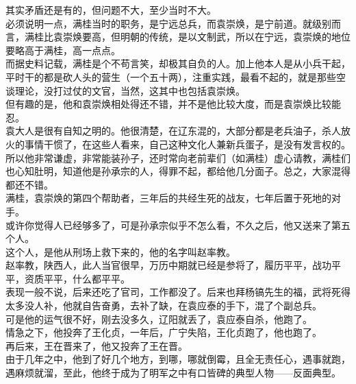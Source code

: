 \begin{multicols}{\theparacolNo}
其实矛盾还是有的，但问题不大，至少当时不大。\\

必须说明一点，满桂当时的职务，是宁远总兵，而袁崇焕，是宁前道。就级别而言，满桂比袁崇焕要高，但明朝的传统，是以文制武，所以在宁远，袁崇焕的地位要略高于满桂，高一点点。\\

而据史料记载，满桂是个不苟言笑，却极其自负的人。加上他本人是从小兵干起，平时干的都是砍人头的营生（一个五十两），注重实践，最看不起的，就是那些空谈理论，没打过仗的文官，当然，这其中也包括袁崇焕。\\

但有趣的是，他和袁崇焕相处得还不错，并不是他比较大度，而是袁崇焕比较能忍。\\

袁大人是很有自知之明的。他很清楚，在辽东混的，大部分都是老兵油子，杀人放火的事情干惯了，在这些人看来，自己这种文化人兼新兵蛋子，是没有发言权的。\\

所以他非常谦虚，非常能装孙子，还时常向老前辈们（如满桂）虚心请教，满桂们也心知肚明，知道他是孙承宗的人，得罪不起，都给他几分面子。总之，大家混得都还不错。\\

满桂，袁崇焕的第四个帮助者，三年后的共经生死的战友，七年后置于死地的对手。\\

或许你觉得人已经够多了，可是孙承宗似乎不怎么看，不久之后，他又送来了第五个人。\\

这个人，是他从刑场上救下来的，他的名字叫赵率教。\\

赵率教，陕西人，此人当官很早，万历中期就已经是参将了，履历平平，战功平平，资质平平，什么都平平。\\

表现一般不说，后来还吃了官司，工作都没了。后来也拜杨镐先生的福，武将死得太多没人补，他就自告奋勇，去补了缺，在袁应泰的手下，混了个副总兵。\\

可是他的运气很不好，刚去没多久，辽阳就丢了，袁应泰自杀，他跑了。\\

情急之下，他投奔了王化贞，一年后，广宁失陷，王化贞跑了，他也跑了。\\

再后来，王在晋来了，他又投奔了王在晋。\\

由于几年之中，他到了好几个地方，到哪，哪就倒霉，且全无责任心，遇事就跑，遇麻烦就溜，至此，他终于成为了明军之中有口皆碑的典型人物——反面典型。\\


\end{multicols}
